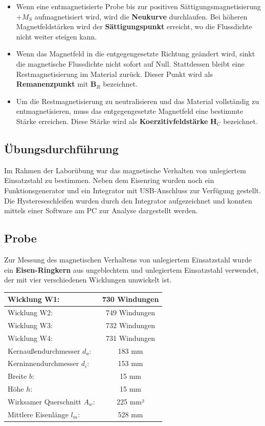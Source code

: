 \documentclass[a4paper,twoside,12pt,DIV=13,BCOR=5mm,numbers=noenddot,cleardoublepage=empty]{scrbook}
\begin{document}
    \begin{itemize}
        \item Wenn eine entmagnetisierte Probe bis zur positiven Sättigungsmagnetisierung $+M_S$ aufmagnetisiert wird, wird die \textbf{Neukurve} durchlaufen. Bei höheren Magnetfeldstärken wird der \textbf{Sättigungspunkt} erreicht, wo die Flussdichte nicht weiter steigen kann.
        \item Wenn das Magnetfeld in die entgegengesetzte Richtung geändert wird, sinkt die magnetische Flussdichte nicht sofort auf Null. Stattdessen bleibt eine Restmagnetisierung im Material zurück. Dieser Punkt wird als \textbf{Remanenzpunkt} mit \textbf{B$_R$} bezeichnet.
        \item Um die Restmagnetisierung zu neutralisieren und das Material vollständig zu entmagnetisieren, muss das entgegengesetzte Magnetfeld eine bestimmte Stärke erreichen. Diese Stärke wird als \textbf{Koerzitivfeldstärke} \textbf{H$_C$} bezeichnet. \\
    \end{itemize}
    
    \subsection{Übungsdurchführung}
    
    Im Rahmen der Laborübung war das magnetische Verhalten von unlegiertem Einsatzstahl zu bestimmen. Neben dem Eisenring wurden noch ein Funktionsgenerator und ein Integrator mit USB-Anschluss zur Verfügung gestellt. Die Hystereseschleifen wurden durch den Integrator aufgezeichnet und konnten mittels einer Software am PC zur Analyse dargestellt werden.
    
    \subsection{Probe}

    Zur Messung des magnetischen Verhaltens von unlegiertem Einsatzstahl wurde ein \textbf{Eisen-Ringkern} aus ungeblechtem und unlegiertem Einsatzstahl verwendet, der mit vier verschiedenen Wicklungen umwickelt ist.

    \begin{center}
    \begin{tabular}{|l|c|} \hline
    Wicklung W1: & 730 Windungen \\ \hline
    Wicklung W2: & 749 Windungen \\ \hline
    Wicklung W3: & 732 Windungen \\ \hline
    Wicklung W4: & 731 Windungen \\ \hline
    Kernaußendurchmesser $d_a$: & 183 mm \\ \hline
    Kerninnendurchmesser $d_i$: & 153 mm \\ \hline
    Breite $b$: & 15 mm \\ \hline
    Höhe $h$: & 15 mm \\ \hline
    Wirksamer Querschnitt $A_w$: & 225 mm² \\ \hline
    Mittlere Eisenlänge $l_m$: & 528 mm \\ \hline
    \end{tabular}
    \end{center}
    
\end{document}
